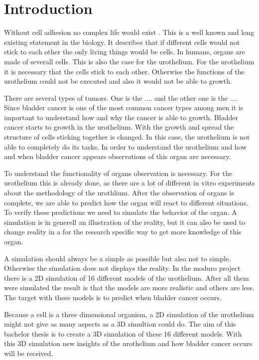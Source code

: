 \chapter{Introduction}

Without cell adhesion no complex life would exist \cite{REF}.
This is a well known and long existing statement in the biology. It describes that if different cells would not stick to each other the only living things would be cells. 
In humans, organs are made of severall cells. This is also the case for the urothelium. For the urothelium it is necessary that the cells stick to each other. Otherwise the functions of the urothelium could not be executed and also it would not be able to growth.%

There are several types of tumors. One is the .... and the other one is the .... Since bladder cancer is one of the most common cancer types among men it is important to understand how and why the cancer is able to growth. Bladder cancer starts to growth in the urothelium. With the growth and spread the structure of cells sticking together is changed. In this case, the urothelium is not able to completely do its tasks. In order to understand the urothelium and how and when bladder cancer appears observations of this organ are necessary. 

To understand the functionality of organs observation is necessary. For the urothelium this is already done, as there are a lot of different in vitro experiments about the methodology of the urothlium. After the observation of organs is complete, we are able to predict how the organ will react to different situations. To verify these predictions we need to simulate the behavior of the organ. A simulation is in generell an illustration of the reality, but it can also be used to change reality in a for the research specific way to get more knowledge of this organ.

A simulation should always be a simple as possible but also not to simple. Otherwise the simulation does not displays the reality. In the moduro project there is a 2D simulation of 16 different models of the urothelium. After all them were simulated the result is that the models are more realistic and others are less. The target with these models is to predict when bladder cancer occurs.

Because a cell is a three dimensional organism, a 2D simulation of the urothelium might not give as many aspects as a 3D simultion could do. The aim of this bachelor thesis is to create a 3D simulation of these 16 different models. With this 3D simulation new insights of the urothelium and how bladder cancer occurs will be received. 

